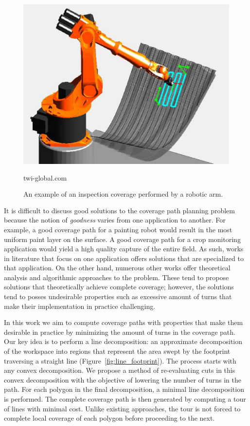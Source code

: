 \documentclass[../main.tex]{subfiles}
\begin{document}
\begin{figure}
	\centering
	\includegraphics[scale=0.5]{img/chapter_1/example_coverage.eps}
	\vskip-15pt
	\caption*{\tiny twi-global.com}
	\caption{An example of an inspection coverage performed by a robotic arm.}
	\label{img:example_coverage}
\end{figure}

It is difficult to discuss good solutions to the coverage path planning problem because the notion of \emph{goodness} varies from one application to another. For example, a good coverage path for a painting robot would result in the most uniform paint layer on the surface. A good coverage path for a crop monitoring application would yield a high quality capture of the entire field. As such, works in literature that focus on one application offers solutions that are specialized to that application. On the other hand, numerous other works offer theoretical analysis and algorithmic approaches to the problem. These tend to propose solutions that theoretically achieve complete coverage; however, the solutions tend to posses undesirable properties such as excessive amount of turns that make their implementation in practice challenging.

In this work we aim to compute coverage paths with properties that make them desirable in practice by minimizing the amount of turns in the coverage path. Our key idea is to perform a line decomposition: an approximate decomposition of the workspace into regions that represent the area swept by the footprint traversing a straight line (Figure~\ref{fig:line_footprint}). The process starts with any convex decomposition. We propose a method of re-evaluating cuts in this convex decomposition with the objective of lowering the number of turns in the path. For each polygon in the final decomposition, a minimal line decomposition is performed. The complete coverage path is then generated by computing a tour of lines with minimal cost. Unlike existing approaches, the tour is not forced to complete local coverage of each polygon before proceeding to the next.
\end{document}
